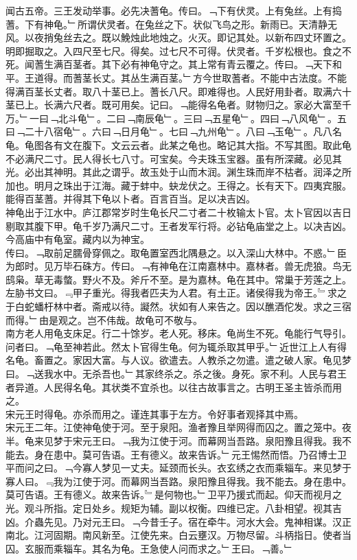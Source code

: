 \documentclass{zhvt-classic}
\begin{document}
\hspace*{2em}闻古五帝。三王发动举事。必先决蓍龟。传曰。﹁下有伏灵。上有兔丝。上有捣蓍。下有神龟。﹂所谓伏灵者。在兔丝之下。状似飞鸟之形。新雨已。天清静无风。以夜捎兔丝去之。既以鮸烛此地烛之。火灭。即记其处。以新布四丈环置之。明即掘取之。入四尺至七尺。得矣。过七尺不可得。伏灵者。千岁松根也。食之不死。闻蓍生满百茎者。其下必有神龟守之。其上常有青云覆之。传曰。﹁天下和平。王道得。而蓍茎长丈。其丛生满百茎。﹂方今世取蓍者。不能中古法度。不能得满百茎长丈者。取八十茎已上。蓍长八尺。即难得也。人民好用卦者。取满六十茎已上。长满六尺者。既可用矣。记曰。﹁能得名龟者。财物归之。家必大富至千万。﹂一曰﹁北斗龟﹂。二曰﹁南辰龟﹂。三曰﹁五星龟﹂。四曰﹁八风龟﹂。五曰﹁二十八宿龟﹂。六曰﹁日月龟﹂。七曰﹁九州龟﹂。八曰﹁玉龟﹂。凡八名龟。龟图各有文在腹下。文云云者。此某之龟也。略记其大指。不写其图。取此龟不必满尺二寸。民人得长七八寸。可宝矣。今夫珠玉宝器。虽有所深藏。必见其光。必出其神明。其此之谓乎。故玉处于山而木润。渊生珠而岸不枯者。润泽之所加也。明月之珠出于江海。藏于蚌中。蚗龙伏之。王得之。长有天下。四夷宾服。能得百茎蓍。并得其下龟以卜者。百言百当。足以决吉凶。\\
\hspace*{2em}神龟出于江水中。庐江郡常岁时生龟长尺二寸者二十枚输太卜官。太卜官因以吉日剔取其腹下甲。龟千岁乃满尺二寸。王者发军行将。必钻龟庙堂之上。以决吉凶。今高庙中有龟室。藏内以为神宝。\\
\hspace*{2em}传曰。﹁取前足臑骨穿佩之。取龟置室西北隅悬之。以入深山大林中。不惑。﹂臣为郎时。见万毕石硃方。传曰。﹁有神龟在江南嘉林中。嘉林者。兽无虎狼。鸟无鸱枭。草无毒螫。野火不及。斧斤不至。是为嘉林。龟在其中。常巢于芳莲之上。左胁书文曰。﹃甲子重光。得我者匹夫为人君。有土正。诸侯得我为帝王。﹄求之于白蛇蟠杅林中者。斋戒以待。譺然。状如有人来告之。因以醮酒佗发。求之三宿而得。﹂由是观之。岂不伟哉。故龟可不敬与。\\
\hspace*{2em}南方老人用龟支床足。行二十馀岁。老人死。移床。龟尚生不死。龟能行气导引。问者曰。﹁龟至神若此。然太卜官得生龟。何为辄杀取其甲乎。﹂近世江上人有得名龟。畜置之。家因大富。与人议。欲遣去。人教杀之勿遣。遣之破人家。龟见梦曰。﹁送我水中。无杀吾也。﹂其家终杀之。杀之後。身死。家不利。人民与君王者异道。人民得名龟。其状类不宜杀也。以往古故事言之。古明王圣主皆杀而用之。\\
\hspace*{2em}宋元王时得龟。亦杀而用之。谨连其事于左方。令好事者观择其中焉。\\
\hspace*{2em}宋元王二年。江使神龟使于河。至于泉阳。渔者豫且举网得而囚之。置之笼中。夜半。龟来见梦于宋元王曰。﹁我为江使于河。而幕网当吾路。泉阳豫且得我。我不能去。身在患中。莫可告语。王有德义。故来告诉。﹂元王惕然而悟。乃召博士卫平而问之曰。﹁今寡人梦见一丈夫。延颈而长头。衣玄绣之衣而乘辎车。来见梦于寡人曰。﹃我为江使于河。而幕网当吾路。泉阳豫且得我。我不能去。身在患中。莫可告语。王有德义。故来告诉。﹄是何物也。﹂卫平乃援式而起。仰天而视月之光。观斗所指。定日处乡。规矩为辅。副以权衡。四维已定。八卦相望。视其吉凶。介蟲先见。乃对元王曰。﹁今昔壬子。宿在牵牛。河水大会。鬼神相谋。汉正南北。江河固期。南风新至。江使先来。白云壅汉。万物尽留。斗柄指日。使者当囚。玄服而乘辎车。其名为龟。王急使人问而求之。﹂王曰。﹁善。﹂\\
\end{document}
